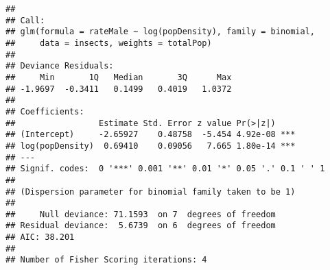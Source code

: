 \documentclass[
]{article}
\newenvironment{Shaded}{\begin{snugshade}}{\end{snugshade}}
\newcommand{\DataTypeTok}[1]{\textcolor[rgb]{0.13,0.29,0.53}{#1}}
\newcommand{\DecValTok}[1]{\textcolor[rgb]{0.00,0.00,0.81}{#1}}
\newcommand{\KeywordTok}[1]{\textcolor[rgb]{0.13,0.29,0.53}{\textbf{#1}}}
\newcommand{\NormalTok}[1]{#1}
\newcommand{\OperatorTok}[1]{\textcolor[rgb]{0.81,0.36,0.00}{\textbf{#1}}}
\newcommand{\StringTok}[1]{\textcolor[rgb]{0.31,0.60,0.02}{#1}}
\begin{document}
\begin{Shaded}
\end{Shaded}

\begin{verbatim}
## 
## Call:
## glm(formula = rateMale ~ log(popDensity), family = binomial, 
##     data = insects, weights = totalPop)
## 
## Deviance Residuals: 
##     Min       1Q   Median       3Q      Max  
## -1.9697  -0.3411   0.1499   0.4019   1.0372  
## 
## Coefficients:
##                 Estimate Std. Error z value Pr(>|z|)    
## (Intercept)     -2.65927    0.48758  -5.454 4.92e-08 ***
## log(popDensity)  0.69410    0.09056   7.665 1.80e-14 ***
## ---
## Signif. codes:  0 '***' 0.001 '**' 0.01 '*' 0.05 '.' 0.1 ' ' 1
## 
## (Dispersion parameter for binomial family taken to be 1)
## 
##     Null deviance: 71.1593  on 7  degrees of freedom
## Residual deviance:  5.6739  on 6  degrees of freedom
## AIC: 38.201
## 
## Number of Fisher Scoring iterations: 4
\end{verbatim}
\end{document}
